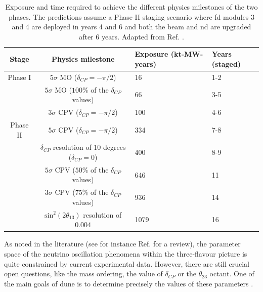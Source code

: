 \begin{table}[]
	\caption[Exposure and time required to achieve the different physics milestones of the two phases.]{Exposure and time required to achieve the different physics milestones of the two phases. The predictions assume a Phase II staging scenario where \gls{fd} modules 3 and 4 are deployed in years 4 and 6 and both the beam and \gls{nd} are upgraded after 6 years. Adapted from Ref. \cite{DUNE2022Snowmass}.}
	\centering
	\begin{tabular}{c|c|C{3.0cm}|C{2.0cm}}
	Stage    & Physics milestone                                          & Exposure (kt-MW-years) & Years (staged) \\[3mm] \hline
	\rule{0pt}{1.1\normalbaselineskip}Phase I  & $5\sigma$ MO ($\delta_{CP} = -\pi/2$)                      & 16                     & 1-2            \\[1mm]
			 & $5\sigma$ MO ($100\%$ of the $\delta_{CP}$ values)         & 66                     & 3-5            \\[1mm]
			 & $3\sigma$ CPV ($\delta_{CP} = -\pi/2$)                     & 100                    & 4-6            \\[1mm] \hline
			 \rule{0pt}{1.1\normalbaselineskip}Phase II & $5\sigma$ CPV ($\delta_{CP} = -\pi/2$)                     & 334                    & 7-8            \\[1mm]
			 & $\delta_{CP}$ resolution of $10$ degrees ($\delta_{CP}=0$) & 400                    & 8-9            \\[1mm]
			 & $5\sigma$ CPV ($50\%$ of the $\delta_{CP}$ values)         & 646                    & 11             \\[1mm]
			 & $3\sigma$ CPV ($75\%$ of the $\delta_{CP}$ values)         & 936                    & 14             \\[1mm]
			 & $\mathrm{sin}^{2}(2\theta_{13})$ resolution of $0.004$       & 1079                   & 16            
	\end{tabular}
	\label{tab:dune_phases_physics}
\end{table}

As noted in the literature (see for instance Ref. \cite{deSalas2020} for a review), the parameter space of the neutrino oscillation phenomena within the three-flavour picture is quite constrained by current experimental data. However, there are still crucial open questions, like the mass ordering, the value of $\delta_{CP}$ or the $\theta_{23}$ octant. One of the main goals of \gls{dune} is to determine precisely the values of these parameters \cite{DUNE2020TDR2}.


